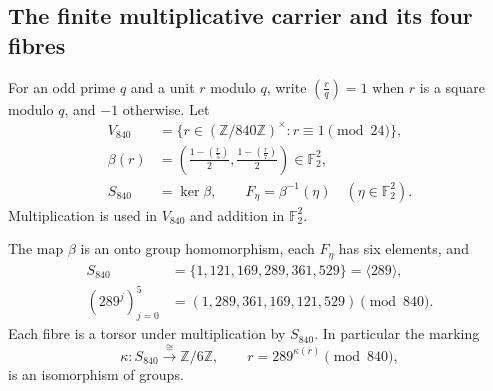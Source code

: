 \subsection{The finite multiplicative carrier and its four fibres}
\label{esn:subsec:residues}

For an odd prime \(q\) and a unit \(r\) modulo \(q\), write
\(\left(\frac rq\right)=1\) when \(r\) is a square modulo \(q\),
and \(-1\) otherwise.  Let
\begin{equation}
 \begin{split}
 V_{840}&=\{r\in(\mathbb Z/840\mathbb Z)^\times:
                                      r\equiv1\pmod {24}\},\\
 \beta(r)&=\left(\frac{1-\left(\frac r5\right)}2,
                  \frac{1-\left(\frac r7\right)}2\right)
                          \in\mathbb F_2^2,\\
 S_{840}&=\ker\beta,\qquad F_\eta=\beta^{-1}(\eta)
                                      \quad(\eta\in\mathbb F_2^2).
 \end{split}
 \label{esn:eq:residue-carrier}
\end{equation}
Multiplication is used in \(V_{840}\) and addition in \(\mathbb F_2^2\).

\begin{theorem}
\label{esn:thm:cyclic-fibre}
The map \(\beta\) is an onto group homomorphism, each \(F_\eta\) has
six elements, and
\begin{equation}
 \begin{split}
 S_{840}&=\{1,121,169,289,361,529\}=\langle289\rangle,\\
 (289^j)_{j=0}^5&=(1,289,361,169,121,529)\pmod {840}.
 \end{split}
 \label{esn:eq:ordered-fibre}
\end{equation}
Each fibre is a torsor under multiplication by \(S_{840}\).  In
particular the marking
\begin{equation}
 \kappa:S_{840}\xrightarrow{\ \cong\ }\mathbb Z/6\mathbb Z,
 \qquad r=289^{\kappa(r)}\pmod {840},
 \label{esn:eq:kappa}
\end{equation}
is an isomorphism of groups.
\end{theorem}

